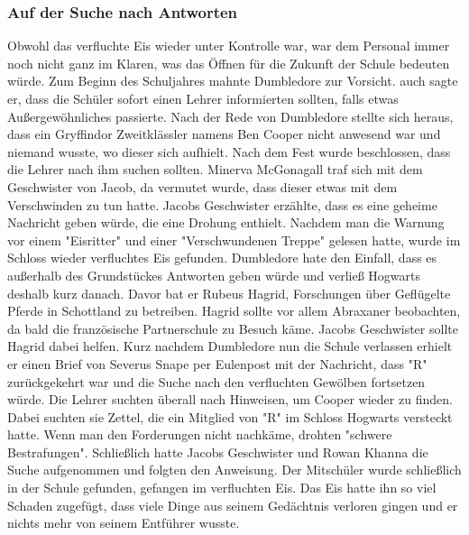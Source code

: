 \documentclass[a4paper, 10pt]{article}
\begin{document}
\subsubsection*{Auf der Suche nach Antworten}
Obwohl das verfluchte Eis wieder unter Kontrolle war, war dem Personal immer noch nicht ganz im Klaren, was das Öffnen für die Zukunft der Schule bedeuten würde. Zum Beginn des Schuljahres mahnte Dumbledore zur Vorsicht. auch sagte er, dass die Schüler sofort einen Lehrer informierten sollten, falls etwas Außergewöhnliches passierte. Nach der Rede von Dumbledore
stellte sich heraus, dass ein Gryffindor Zweitklässler namens Ben Cooper nicht anwesend war und niemand wusste, wo dieser sich aufhielt. Nach dem Fest wurde beschlossen, dass die Lehrer nach ihm suchen sollten. Minerva McGonagall traf sich mit dem Geschwister von Jacob, da vermutet wurde, dass dieser etwas mit dem Verschwinden zu tun hatte. Jacobs Geschwister erzählte, dass es eine geheime Nachricht geben würde, die eine Drohung enthielt.
\vspace{10pt}
\newline
{}  
Nachdem man die Warnung vor einem "Eisritter" und einer "Verschwundenen Treppe" gelesen hatte, wurde im Schloss wieder verfluchtes Eis gefunden. Dumbledore hate den Einfall, dass es außerhalb des Grundstückes Antworten geben würde und verließ Hogwarts deshalb kurz danach. Davor bat er Rubeus Hagrid, Forschungen über Geflügelte Pferde in Schottland zu betreiben. Hagrid sollte vor allem Abraxaner beobachten, da bald die französische Partnerschule zu Besuch käme. Jacobs Geschwister sollte Hagrid dabei helfen. Kurz nachdem Dumbledore nun die Schule verlassen erhielt er einen Brief von Severus Snape per Eulenpost mit der Nachricht, dass "R" zurückgekehrt war und die Suche nach den verfluchten Gewölben fortsetzen würde.
\vspace{10pt}
\newline
{}  
Die Lehrer suchten überall nach Hinweisen, um Cooper wieder zu finden. Dabei suchten sie Zettel, die ein Mitglied von "R" im Schloss Hogwarts versteckt hatte. Wenn man den Forderungen nicht nachkäme, drohten "schwere Bestrafungen". Schließlich hatte Jacobs Geschwister und Rowan Khanna die Suche aufgenommen und folgten den Anweisung. Der Mitschüler wurde schließlich in der Schule gefunden, gefangen im verfluchten Eis. Das Eis hatte ihn so viel Schaden zugefügt, dass viele Dinge aus seinem Gedächtnis verloren gingen und er nichts mehr von seinem Entführer wusste.
\end{document}
